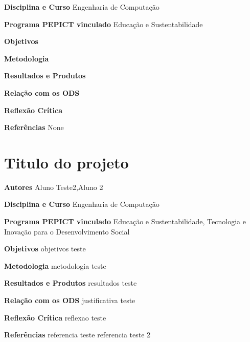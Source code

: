 \documentclass[12pt,openright,oneside,a4paper]{report}
\begin{document}
\vspace{0.7cm}
\noindent
\textbf{Disciplina e Curso}
Engenharia de Computação

\vspace{0.7cm}
\noindent
\textbf{Programa PEPICT vinculado}
Educação e Sustentabilidade

\vspace{0.7cm}
\noindent
\textbf{Objetivos}


\vspace{0.7cm}
\noindent
\textbf{Metodologia}


\vspace{0.7cm}
\noindent
\textbf{Resultados e Produtos}


\vspace{0.7cm}
\noindent
\textbf{Relação com os ODS}


\vspace{0.7cm}
\noindent
\textbf{Reflexão Crítica}


\vspace{0.7cm}
\noindent
\textbf{Referências}
None

\vspace{0.7cm}
\section{Titulo do projeto}
\noindent
\textbf{Autores}
Aluno Teste2,Aluno 2

\vspace{0.7cm}
\noindent
\textbf{Disciplina e Curso}
Engenharia de Computação

\vspace{0.7cm}
\noindent
\textbf{Programa PEPICT vinculado}
Educação e Sustentabilidade, Tecnologia e Inovação para o Desenvolvimento Social

\vspace{0.7cm}
\noindent
\textbf{Objetivos}
objetivos teste

\vspace{0.7cm}
\noindent
\textbf{Metodologia}
metodologia teste

\vspace{0.7cm}
\noindent
\textbf{Resultados e Produtos}
resultados teste

\vspace{0.7cm}
\noindent
\textbf{Relação com os ODS}
justificativa teste

\vspace{0.7cm}
\noindent
\textbf{Reflexão Crítica}
reflexao teste

\vspace{0.7cm}
\noindent
\textbf{Referências}
referencia teste
referencia teste 2
\end{document}

